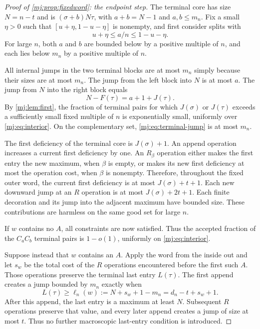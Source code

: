\documentclass[11pt,a4paper]{article}
\theoremstyle{definition}\newaliascnt{definition}{theorem}
\theoremstyle{remark}\newaliascnt{remark}{theorem}
\begin{document}
\begin{proof}[Proof of \cref{mj:prop:fixedword}: the endpoint step]
The terminal core has size $N=n-t$ and is $(\sigma+b)N\tau$, with
$a+b=N-1$ and $a,b\le m_n$. Fix a small $\eta>0$ such that
$[u+\eta,1-u-\eta]$ is nonempty, and first consider splits with
\begin{equation}
 u+\eta\le a/n\le1-u-\eta.
 \label{mj:eq:interior}
\end{equation}
For large $n$, both $a$ and $b$ are bounded below by a positive multiple of
$n$, and each lies below $m_n$ by a positive multiple of $n$.

All internal jumps in the two terminal blocks are at most $m_n$ simply
because their sizes are at most $m_n$. The jump from the left block into $N$
is at most $a$. The jump from $N$ into the right block equals
\begin{equation}
 N-F(\tau)=a+1+J(\tau).
 \label{mj:eq:terminal-jump}
\end{equation}
By \cref{mj:lem:first}, the fraction of terminal pairs for which $J(\sigma)$
or $J(\tau)$ exceeds a sufficiently small fixed multiple of $n$ is
exponentially small, uniformly over \eqref{mj:eq:interior}. On the
complementary set, \eqref{mj:eq:terminal-jump} is at most $m_n$.

The first deficiency of the terminal core is $J(\sigma)+1$. An append
operation increases a current first deficiency by one. An $R_\beta$ operation
either makes the first entry the new maximum, when $\beta$ is empty, or makes
its new first deficiency at most the operation cost, when $\beta$ is
nonempty. Therefore, throughout the fixed outer word, the current first
deficiency is at most $J(\sigma)+t+1$. Each new downward jump at an $R$
operation is at most $J(\sigma)+2t+1$. Each finite decoration and its jump
into the adjacent maximum have bounded size. These contributions are
harmless on the same good set for large $n$.

If $w$ contains no $A$, all constraints are now satisfied. Thus the accepted
fraction of the $C_aC_b$ terminal pairs is $1-o(1)$, uniformly on
\eqref{mj:eq:interior}.

Suppose instead that $w$ contains an $A$. Apply the word from the inside out
and let $s_w$ be the total cost of the $R$ operations encountered before the
first such $A$. Those operations preserve the terminal last entry $L(\tau)$.
The first append creates a jump bounded by $m_n$ exactly when
\begin{equation}
 L(\tau)\ge \ell_n(w):=N+s_w+1-m_n
                  =d_n-t+s_w+1.
 \label{mj:eq:append-threshold}
\end{equation}
After this append, the last entry is a maximum at least $N$. Subsequent $R$
operations preserve that value, and every later append creates a jump of
size at most $t$. Thus no further macroscopic last-entry condition is
introduced.


\end{proof}
\end{document}
